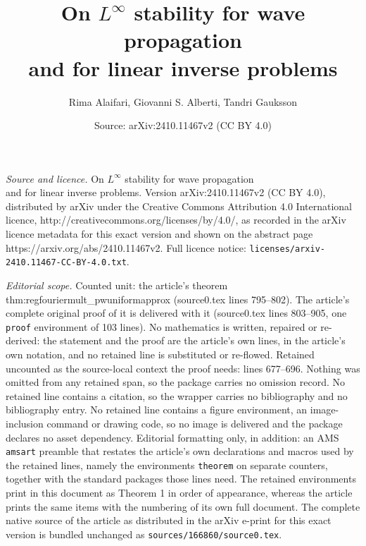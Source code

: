 \documentclass[10pt,a4paper]{amsart}
\title{On $L^\infty$ stability for wave propagation \\ and for linear inverse problems}
\author{Rima Alaifari, Giovanni S. Alberti, Tandri Gauksson}
\date{Source: arXiv:2410.11467v2 (CC BY 4.0)}
\begin{document}
\maketitle

\noindent\emph{Source and licence.} On $L^\infty$ stability for wave propagation \\ and for linear inverse problems. Version arXiv:2410.11467v2 (CC BY 4.0), distributed by arXiv under the Creative Commons Attribution 4.0 International licence, http://creativecommons.org/licenses/by/4.0/, as recorded in the arXiv licence metadata for this exact version and shown on the abstract page https://arxiv.org/abs/2410.11467v2. Full licence notice: \texttt{licenses/arxiv-2410.11467-CC-BY-4.0.txt}.\par\smallskip

\noindent\textit{Editorial scope.} Counted unit: the article's theorem thm:regfouriermult\_pwuniformapprox (source0.tex lines 795--802). The article's complete original proof of it is delivered with it (source0.tex lines 803--905, one \texttt{proof} environment of 103 lines). No mathematics is written, repaired or re-derived: the statement and the proof are the article's own lines, in the article's own notation, and no retained line is substituted or re-flowed.  Retained uncounted as the source-local context the proof needs: lines 677--696.  Nothing was omitted from any retained span, so the package carries no omission record.  No retained line contains a citation, so the wrapper carries no bibliography and no bibliography entry.  No retained line contains a figure environment, an image-inclusion command or drawing code, so no image is delivered and the package declares no asset dependency.  Editorial formatting only, in addition: an AMS \texttt{amsart} preamble that restates the article's own declarations and macros used by the retained lines, namely the environments \texttt{theorem} on separate counters, together with the standard packages those lines need.  The retained environments print in this document as Theorem 1 in order of appearance, whereas the article prints the same items with the numbering of its own full document.  The complete native source of the article as distributed in the arXiv e-print for this exact version is bundled unchanged as \texttt{sources/166860/source0.tex}.
\end{document}
